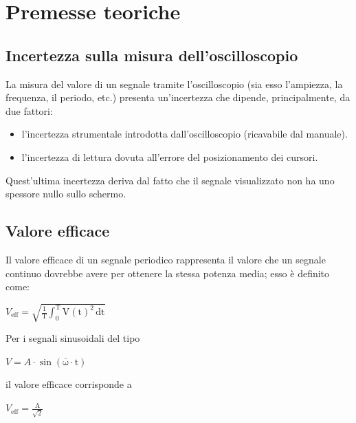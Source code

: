 \documentclass[a4paper]{article}
\begin{document}
	\section{Premesse teoriche}
		\subsection{Incertezza sulla misura dell'oscilloscopio}
			La misura del valore di un segnale tramite l’oscilloscopio (sia esso l'ampiezza, la frequenza, il periodo, etc.) presenta un'incertezza che dipende, principalmente, da due fattori:
			\begin{itemize}
				\item l’incertezza strumentale introdotta dall’oscilloscopio (ricavabile dal manuale).
				\item l’incertezza di lettura dovuta all’errore del posizionamento dei cursori.
			\end{itemize}
			Quest’ultima incertezza deriva dal fatto che il segnale visualizzato non ha uno spessore nullo sullo schermo.
		\subsection{Valore efficace}
			Il valore efficace di un segnale periodico rappresenta il valore che un segnale continuo dovrebbe avere per ottenere la stessa potenza media; esso è definito come:
			\newline
			\begin{center}
				$ V_{\mathrm{eff}} = \mathrm{\sqrt{\frac{1}{T} \int_{0}^{T} V(t)^{2} \, dt}} $
			\end{center}
			\newline
			Per i segnali sinusoidali del tipo
			\newline
			\begin{center}
				$ V = A \cdot \mathrm{\sin(\overline{\omega} \cdot t)} $
			\end{center}
			il valore efficace corrisponde a
			\newline
			\begin{center}
				$ V_{\mathrm{eff}} = \mathrm{\frac{A}{\sqrt{2}}} $
			\end{center}
\end{document}
